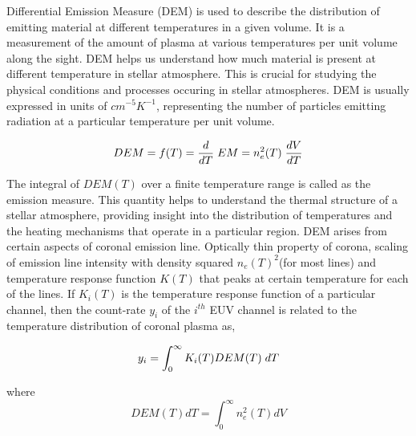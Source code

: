 Differential Emission Measure (DEM) is used to describe the distribution of emitting material at different temperatures in a given volume. It is a measurement of the amount of plasma at various temperatures per unit volume along the sight. DEM helps us understand how much material is present at different temperature in stellar atmosphere. This is crucial for studying the physical conditions and processes occuring in stellar atmospheres. DEM is usually expressed in units of $cm^{-5}K^{-1}$, representing the number of particles emitting radiation at a particular temperature per unit volume.

\vspace{-.75cm}
\everymath{\displaystyle}
\begin{center}
    \begin{equation}
        DEM = f(T) = \frac{d}{dT}\hspace{0.1cm} EM = n_e^2(T) \hspace{0.1cm} \frac{dV}{dT}
    \end{equation}
\end{center}

The integral of $DEM(T)$ over a finite temperature range is called as the emission measure. This quantity helps to understand the thermal structure of a stellar atmosphere, providing insight into the distribution of temperatures and the heating mechanisms that operate in a particular region. DEM arises from certain aspects of coronal emission line. Optically thin property of corona, scaling of emission line intensity with density squared $n_e(T)^2$(for most lines) and temperature response function $K(T)$ that peaks at certain temperature for each of the lines. If $K_i(T)$ is the temperature response function of a particular channel, then the count-rate $y_i$ of the $i^{th}$ EUV channel is related to the temperature distribution of coronal plasma as,

\vspace{-.75cm}
\begin{center}
    \begin{equation}
        \label{eqn:count_rate_dem}
        y_i = \int_0^{\infty} K_i(T) DEM(T) \hspace{0.1cm} dT
    \end{equation}
\end{center}

where
\begin{equation}
    DEM(T)dT = \int_0^{\infty}n_e^2(T)dV
\end{equation}

